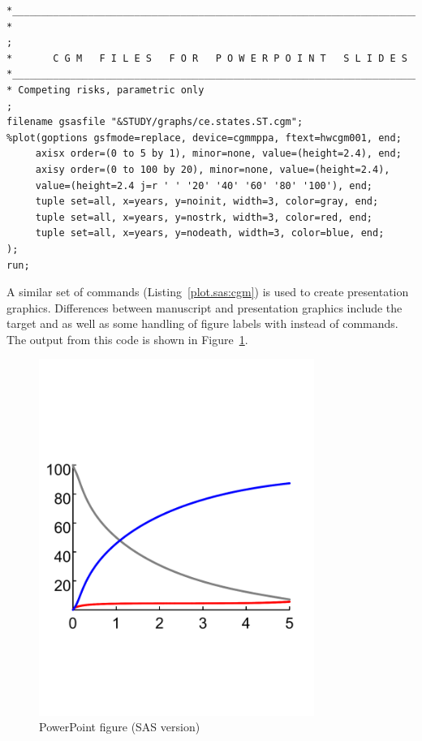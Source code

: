 \documentclass[nojss]{jss}\usepackage[]{graphicx}\usepackage[]{color}
\begin{document}
\begin{lstlisting}[float,floatplacement=!htpb, caption={plot.sas commands: PowerPoint graphics using CGM instructions.}, label={plot.sas:cgm}]
*____________________________________________________________________________;
*                                                                            ;
*       C G M   F I L E S   F O R   P O W E R P O I N T   S L I D E S
*____________________________________________________________________________;
* Competing risks, parametric only                                           ;
filename gsasfile "&STUDY/graphs/ce.states.ST.cgm";
%plot(goptions gsfmode=replace, device=cgmmppa, ftext=hwcgm001, end;
     axisx order=(0 to 5 by 1), minor=none, value=(height=2.4), end;
     axisy order=(0 to 100 by 20), minor=none, value=(height=2.4), 
     value=(height=2.4 j=r ' ' '20' '40' '60' '80' '100'), end;
     tuple set=all, x=years, y=noinit, width=3, color=gray, end;
     tuple set=all, x=years, y=nostrk, width=3, color=red, end;
     tuple set=all, x=years, y=nodeath, width=3, color=blue, end;
);
run;  
\end{lstlisting}

A similar set of  commands (Listing~\ref{plot.sas:cgm}) is used to create presentation graphics.
Differences between manuscript and presentation graphics include the target  and  as well as some handling of figure labels with  instead of  commands. The output from this code is shown in Figure~\ref{F:sasPowerPoint}. 

\begin{figure}[!htpb]
\centering
\includegraphics[width=0.8\textwidth]{../inst/ceStatesST_ppt.pdf}
\caption{PowerPoint figure (SAS version)}
\label{F:sasPowerPoint}
\end{figure}
\end{document}
